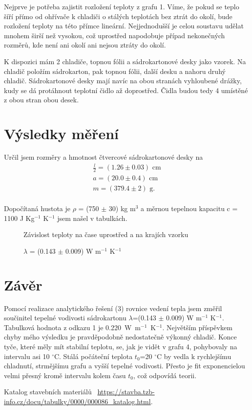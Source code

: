 \documentclass[a4paper,11pt]{article}
\begin{document}
Nejprve je potřeba zajistit rozložení teploty z grafu 1. Víme, že pokud se teplo šíří přímo od ohřívače k chladiči o stálých teplotách bez ztrát do okolí, bude rozložení teploty na této přímce lineární. Nejjednodušší je celou soustavu udělat mnohem širší než vysokou, což uprostřed napodobuje případ nekonečných rozměrů, kde není ani okolí ani nejsou ztráty do okolí.

K dispozici mám 2 chladiče, topnou fólii a sádrokartonové desky jako vzorek. Na chladič položím sádrokarton, pak topnou fólii, další desku a nahoru druhý chladič. Sádrokartonové desky mají navíc na obou stranách vyhloubené drážky, kudy se dá protáhnout teplotní čidlo až doprostřed. Čidla budou tedy 4 umístěné z obou stran obou desek. 

\section{Výsledky měření}

Určil jsem rozměry a hmotnost čtvercové sádrokartonové desky na
\begin{align*}
  \frac{l}{2} = (1.26 \pm 0.03) \text{ cm} \\
  a = (20.0 \pm 0.4) \text{ cm} \\
  m = (379.4 \pm 2) \text{ g.} \\
\end{align*}

Dopočítaná hustota je $\rho$ = (750 $\pm$ 30) kg m$^3$ a měrnou tepelnou kapacitu c = 1100 J Kg$^{-1}$ K$^{-1}$ jsem našel v tabulkách.


\begin{figure}[htpb]
  \centering
  
  \caption{Závislost teploty na čase uprostřed a na krajích vzorku }
  \caption*{$\lambda$ = (0.143 $\pm$ 0.009) W m$^{-1}$ K$^{-1}$}
\end{figure}

\section{Závěr}

Pomocí realizace analytického řešení (3) rovnice vedení tepla jsem změřil součinitel tepelné vodivosti sádrokartonu $\lambda$=(0.143 $\pm$ 0.009) W m$^{-1}$ K$^{-1}$. Tabulková hodnota z odkazu 1 je 0.220~W~m$^{-1}$~K$^{-1}$. Největším příspěvkem chyby mého výsledku je pravděpodobně nedostatečně výkonný chladič. Konce tyče, které měly mít stabilní teplotu, se, jak je vidět v grafu 4, pohybovaly na intervalu asi 10 $^{\circ}$C. Stálá počáteční teplota $t_0$=20 $^{\circ}$C by vedla k rychlejšímu chladnutí, strmějšímu grafu a vyšší tepelné vodivosti. Přesto je fit exponencielou velmi přesný kromě intervalu kolem času $t_0$, což odpovídá teorii. 

\begin{thebibliography}{0}
 Katalog stavebních materiálů ~\url{https://stavba.tzb-info.cz/docu/tabulky/0000/000086_katalog.html}.   
\end{thebibliography}
\end{document}
